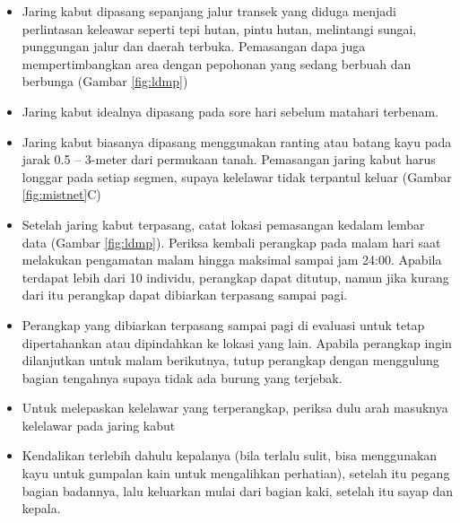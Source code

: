 \documentclass[
]{book}
\providecommand{\tightlist}{%
  \setlength{\itemsep}{0pt}\setlength{\parskip}{0pt}}
\begin{document}
\begin{itemize}
\tightlist
\item
  Jaring kabut dipasang sepanjang jalur transek yang diduga menjadi perlintasan keleawar seperti tepi hutan, pintu hutan, melintangi sungai, punggungan jalur dan daerah terbuka. Pemasangan dapa juga mempertimbangkan area dengan pepohonan yang sedang berbuah dan berbunga (Gambar \ref{fig:ldmp})
\item
  Jaring kabut idealnya dipasang pada sore hari sebelum matahari terbenam.
\item
  Jaring kabut biasanya dipasang menggunakan ranting atau batang kayu pada jarak 0.5 -- 3-meter dari permukaan tanah. Pemasangan jaring kabut harus longgar pada setiap segmen, supaya kelelawar tidak terpantul keluar (Gambar \ref{fig:mistnet}C)
\item
  Setelah jaring kabut terpasang, catat lokasi pemasangan kedalam lembar data (Gambar \ref{fig:ldmp}). Periksa kembali perangkap pada malam hari saat melakukan pengamatan malam hingga maksimal sampai jam 24:00. Apabila terdapat lebih dari 10 individu, perangkap dapat ditutup, namun jika kurang dari itu perangkap dapat dibiarkan terpasang sampai pagi.
\item
  Perangkap yang dibiarkan terpasang sampai pagi di evaluasi untuk tetap dipertahankan atau dipindahkan ke lokasi yang lain. Apabila perangkap ingin dilanjutkan untuk malam berikutnya, tutup perangkap dengan menggulung bagian tengahnya supaya tidak ada burung yang terjebak.
\item
  Untuk melepaskan kelelawar yang terperangkap, periksa dulu arah masuknya kelelawar pada jaring kabut
\item
  Kendalikan terlebih dahulu kepalanya (bila terlalu sulit, bisa menggunakan kayu untuk gumpalan kain untuk mengalihkan perhatian), setelah itu pegang bagian badannya, lalu keluarkan mulai dari bagian kaki, setelah itu sayap dan kepala.
\end{itemize}
\end{document}
